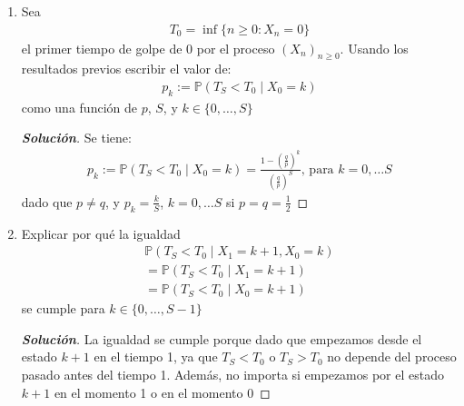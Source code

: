 \documentclass[12pt, letterpaper]{article}
\newcommand{\p}{\mathbb{P}}
\newenvironment{manualtheorem}[1]{%
  \renewcommand\themanualtheoreminner{#1}%
  \manualtheoreminner
}{\endmanualtheoreminner}
\newenvironment{solucion}
  {\renewcommand\qedsymbol{$\square$}\begin{proof}[\textbf{Solución}]}
  {\end{proof}}
\begin{document}
\begin{manualtheorem}{3.2}
\begin{enumerate}
        \item Sea
        \begin{align*}
            T_0=\inf \{ n\geq 0 : X_n=0\}
        \end{align*}
        el primer tiempo de golpe de 0 por el proceso $(X_n)_{n\geq0}$. Usando los resultados previos escribir el valor de:
        \begin{align*}
            p_k:= \p(T_S< T_0\mid X_0=k)
        \end{align*}
        como una función de $p$, $S$, y $k\in \{0,\dots,S\}$
        
        \begin{solucion}
            Se tiene:
            \begin{align*}
                p_k:= \p(T_S< T_0\mid X_0=k)=\frac{1-(\frac{q}{p})^k}{(\frac{q}{p})^S}\textrm{, para }k=0,\dots S
            \end{align*}
            dado que $p\neq q$, y $p_k= \frac{k}{S}$, $k=0,\dots S$ si $p=q=\frac{1}{2}$
        \end{solucion}
        
        \item Explicar por qué la igualdad
        \begin{align*}
            \p(T_S< T_0\mid X_1=k+1, X_0=k)\\
            =\p(T_S< T_0\mid X_1=k+1)\\
            =\p(T_S< T_0\mid X_0=k+1)
        \end{align*}
        se cumple para $k\in \{0,\dots,S-1 \}$
        \begin{solucion}
            La igualdad se cumple porque dado que empezamos desde el estado $k+1$ en el tiempo 1, ya que $T_S<T_0$ o $T_S>T_0$ no depende del proceso pasado antes del tiempo 1. Además, no importa si empezamos por el estado $k +1$ en el momento 1 o en el momento 0
        \end{solucion}
        

\end{enumerate}
\end{manualtheorem}
\end{document}
